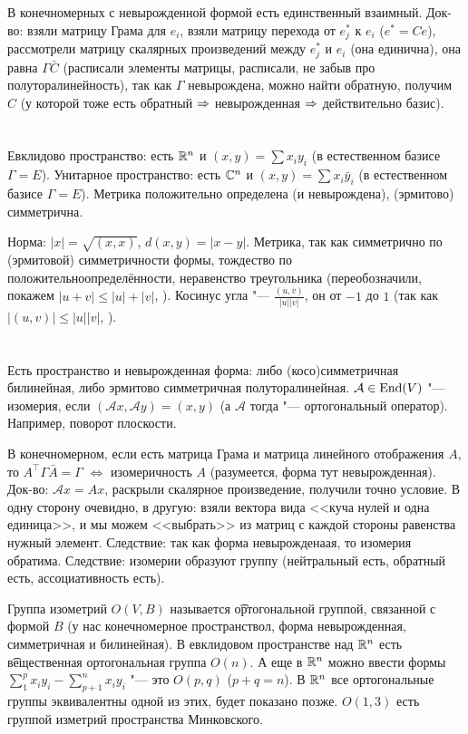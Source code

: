 В конечномерных с невырожденной формой есть единственный взаимный.
Док-во: взяли матрицу Грама для $e_i$, взяли матрицу перехода от $e_j^*$ к $e_i$ ($e^*=Ce$), рассмотрели
матрицу скалярных произведений между $e_j^*$ и $e_i$ (она единична), она равна $\Gamma \bar C$ (расписали элементы матрицы, расписали, не забыв про полуторалинейность),
так как $\Gamma$ невырождена, можно найти обратную, получим $C$ (у которой тоже есть обратный $\Rightarrow$ невырожденная $\Rightarrow$ действительно базис).

\section{} %
Евклидово пространство: есть $\mathbb{R}^n$ и $(x, y) = \sum x_iy_i$ (в естественном базисе $\Gamma=E$).
Унитарное пространство: есть $\mathbb{C}^n$ и $(x, y) = \sum x_i\bar y_i$ (в естественном базисе $\Gamma=E$).
Метрика положительно определена (и невырождена), (эрмитово) симметрична.

Норма: $|x|=\sqrt{(x,x)}$, $d(x, y)=|x-y|$.
Метрика, так как симметрично по (эрмитовой) симметричности формы, тождество по положительноопределённости,
неравенство треугольника (переобозначили, покажем $|u+v|\le|u|+|v|$, \TODO).
Косинус угла "--- $\frac{(u,v)}{|u||v|}$, он от $-1$ до $1$ (так как $|(u, v)| \le |u||v|$, \TODO).

\section{} %
Есть пространство и невырожденная форма: либо (косо)симметричная билинейная, либо эрмитово симметричная полуторалинейная.
$\mathcal{A} \in \operatorname{End}(V)$ "--- изомерия, если $(\mathcal{A}x, \mathcal{A}y) = (x, y)$ (а $\mathcal{A}$ тогда "--- ортогональный оператор).
Например, поворот плоскости.

В конечномерном, если есть матрица Грама и матрица линейного отображения $A$, то $A^\top \Gamma \bar A = \Gamma$ $\iff$ изомеричность $A$ (разумеется, форма тут невырожденная).
Док-во: $\mathcal{A} x = Ax$, раскрыли скалярное произведение, получили точно условие.
В одну сторону очевидно, в другую: взяли вектора вида <<куча нулей и одна единица>>, и мы можем <<выбрать>> из матриц с каждой стороны равенства нужный элемент.
Следствие: так как форма невырожденаая, то изомерия обратима.
Следствие: изомерии образуют группу (нейтральный есть, обратный есть, ассоциативность есть).

Группа изометрий $O(V, B)$ называется \t{ортогональной группой, связанной с формой $B$} (у нас конечномерное пространствол, форма невырожденная, симметричная и билинейная).
В евклидовом пространстве над $\mathbb{R}^n$ есть \t{вещественная ортогональная группа} $O(n)$.
А еще в $\mathbb{R}^n$ можно ввести формы $\sum_1^p x_iy_i - \sum_{p+1}^n x_iy_i$ "--- это $O(p, q)$ ($p+q=n$).
В $\mathbb{R}^n$ все ортогональные группы эквивалентны одной из этих, будет показано позже.
$O(1, 3)$ есть группой изметрий пространства Минковского.

